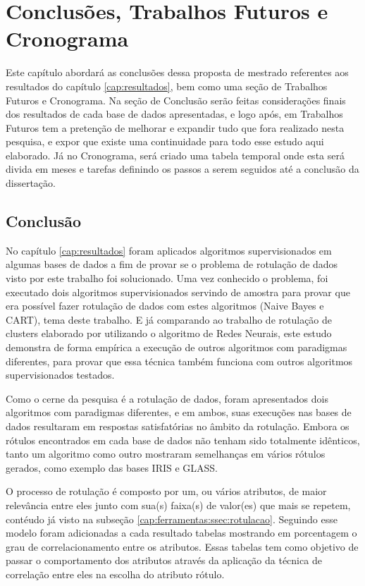 \chapter{Conclusões, Trabalhos Futuros e Cronograma}\label{cap:conclusao} 

Este capítulo abordará as conclusões dessa  proposta de mestrado referentes aos resultados do capítulo \ref{cap:resultados},  bem como uma seção de Trabalhos Futuros e  Cronograma. Na seção de Conclusão serão feitas considerações finais dos resultados de cada base de dados apresentadas, e logo após, em Trabalhos Futuros tem a pretenção de melhorar e expandir tudo que fora realizado  nesta pesquisa, e expor que existe uma continuidade para todo esse estudo aqui elaborado. Já no Cronograma, será criado uma tabela temporal onde esta será divida em meses e tarefas definindo os passos a serem seguidos até a conclusão da dissertação.

\section{Conclusão}\label{cond}
No capítulo \ref{cap:resultados} foram aplicados algoritmos supervisionados em algumas bases de dados a fim de provar se o problema  de rotulação de dados visto por este  trabalho foi solucionado. Uma vez conhecido o problema, foi executado dois algoritmos supervisionados servindo de amostra para provar que era possível fazer rotulação de dados com estes algoritmos (Naive Bayes e CART), tema deste trabalho. E já comparando ao trabalho de rotulação de clusters elaborado por  utilizando o algoritmo de Redes Neurais, este estudo demonstra de forma empírica a execução de outros algoritmos com paradigmas diferentes, para provar que essa técnica também funciona com outros algoritmos supervisionados testados.

Como o cerne da pesquisa é a rotulação de dados, foram apresentados dois algoritmos com paradigmas diferentes, e em ambos, suas execuções nas bases de dados resultaram em respostas satisfatórias no âmbito da rotulação. Embora os rótulos encontrados  em cada base de dados não tenham sido totalmente idênticos, tanto um algoritmo como outro mostraram semelhanças em vários rótulos gerados, como exemplo das bases IRIS e GLASS.

O processo de rotulação é composto por um, ou vários atributos, de maior relevância entre eles junto com sua(s) faixa(s) de valor(es) que mais se repetem, contéudo já visto na subseção \ref{cap:ferramentas:ssec:rotulacao}. Seguindo esse modelo foram adicionadas a cada resultado tabelas mostrando em porcentagem o grau de correlacionamento entre os atributos. Essas tabelas tem como objetivo de passar o comportamento dos atributos através da aplicação da técnica de  correlação entre eles na escolha do atributo rótulo.

